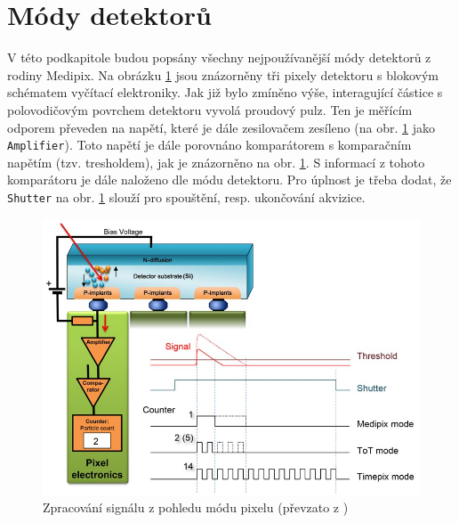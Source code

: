 \section{Módy detektorů}\label{det:mod}
V této podkapitole budou popsány všechny nejpoužívanější módy detektorů z rodiny Medipix. 
Na obrázku \ref{fig:det:signal_proc} jsou znázorněny tři pixely detektoru s blokovým schématem vyčítací elektroniky. Jak již bylo zmíněno výše, interagující částice s polovodičovým povrchem detektoru vyvolá proudový pulz. Ten je měřícím odporem převeden na napětí, které je dále zesilovačem zesíleno (na obr. \ref{fig:det:signal_proc} jako \texttt{Amplifier}). Toto napětí je dále porovnáno komparátorem s komparačním napětím (tzv. tresholdem), jak je znázorněno na obr. \ref{fig:det:signal_proc}. S informací z tohoto komparátoru je dále naloženo dle módu detektoru. Pro úplnost je třeba dodat, že \texttt{Shutter} na obr. \ref{fig:det:signal_proc} slouží pro spouštění, resp. ukončování akvizice.

\begin{figure}[th]
	\begin{center}
		\includegraphics[width=12cm]{figures/det_pix.png}
		\caption{Zpracování signálu z pohledu módu pixelu (převzato z \cite{PlatkevicDisertace})}
		\label{fig:det:signal_proc}
	\end{center}
\end{figure}

